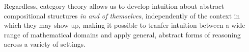 \documentclass[draft,11pt]{report}
\theoremstyle{definition}
\begin{document}
Regardless,
category theory allows us
to develop intuition about abstract compositional structures
\emph{in and of themselves},
independently of the context in which they may show up,
making it possible to tranfer intuition between
a wide range of mathematical domains
and apply general, abstract forms of reasoning
across a variety of settings.

%
\end{document}
